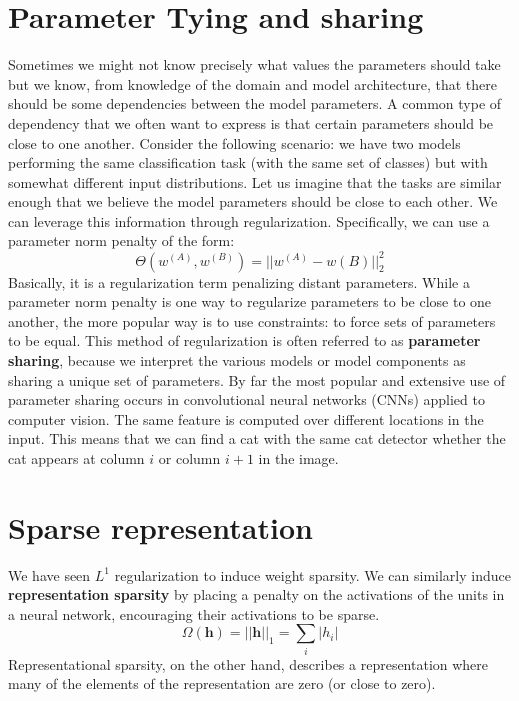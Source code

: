 \section{Parameter Tying and sharing}
Sometimes we might not know precisely what values the parameters should take but we know, from knowledge of the domain and model architecture, that there should be some dependencies between the model parameters.\newline\newline
A common type of dependency that we often want to express is that certain parameters should be close to one another. Consider the following scenario: we have two models performing the same classification task (with the same set of classes) but with somewhat different input distributions. Let us imagine that the tasks are similar enough that we believe the model parameters should be close to each other. We can leverage this information
through regularization. Specifically, we can use a parameter norm penalty of the form:
\[\Theta (w^{(A)}, w^{(B)}) = ||w^{(A)} - w{(B)}||^2_2\]
Basically, it is a regularization term penalizing distant parameters. While a parameter norm penalty is one way to regularize parameters to be close to one another, the more popular way is to use constraints: to force sets of parameters to be equal. This method of regularization is often referred to as
\textbf{parameter sharing}, because we interpret the various models or model components as sharing a unique set of parameters.\newline\newline
By far the most popular and extensive use of parameter sharing occurs in convolutional neural networks (CNNs) applied to computer vision. The same feature is computed over different locations in the input. This means that we can find a cat with the same cat detector whether the cat appears at column $i$ or column $i + 1$ in the image.

\section{Sparse representation}
We have seen $L^1$ regularization to induce weight sparsity. We can similarly induce \textbf{representation sparsity} by placing a penalty on the activations of the units in a neural network, encouraging their activations to be sparse.
\[\Omega(\textbf{h}) = ||\textbf{h}||_1 = \sum_i|h_i|\]
Representational sparsity, on the other hand, describes a
representation where many of the elements of the representation are zero (or close to zero).

